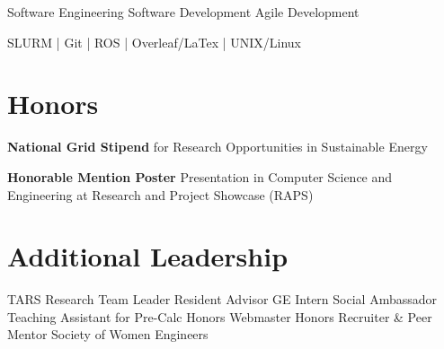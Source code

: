\documentclass[]{resume-formatting}
\begin{document}
\begin{minipage}[t]{0.29\textwidth}
\sectionsep
{} \newline
Software Engineering \newline
Software Development \newline
Agile Development %
\sectionsep

 \newline
SLURM | Git | ROS | \newline
Overleaf/LaTex |\newline
UNIX/Linux 
\sectionsep


\section{Honors}
\textbf{National Grid Stipend} for Research Opportunities in Sustainable Energy
\sectionsep

\textbf{Honorable Mention Poster} Presentation in Computer Science and Engineering at Research and Project Showcase (RAPS)



\sectionsep


\section{Additional Leadership}
TARS Research Team Leader \newline
Resident Advisor \newline
GE Intern Social Ambassador
Teaching Assistant for Pre-Calc \newline
Honors Webmaster \newline
Honors Recruiter \& Peer Mentor \newline
Society of Women Engineers



\end{minipage} %
\end{document}
